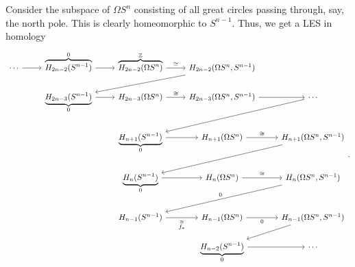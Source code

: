\documentclass[10pt,letterpaper,cm]{nupset}
\theoremstyle{definition}
\theoremstyle{theorem}
\theoremstyle{remark}
\newcommand{\Z}{\mathbb Z}
\newcommand{\1}{\mathbb{1}}
\newcommand{\0}{\vec 0}
\begin{document}
Consider the subspace of $\Omega{S^n}$ consisting of all great circles passing through, say, the north pole. This is clearly homeomorphic to $S^{n-1}$. Thus, we get a LES in homology
\[
\begin{tikzcd}
\cdots \arrow[r] & \overbrace{H_{2n-2}(S^{n-1})}^{0} \arrow[r]  & \overbrace{H_{2n-2}(\Omega{S^n})}^{\Z} \arrow[r, "\cong"] & {H_{2n-2}(\Omega{S^n}, S^{n-1})} \arrow[lld] &                                                 \\
                 & \underbrace{H_{2n-3}(S^{n-1})}_{0} \arrow[r] & H_{2n-3}(\Omega{S^n}) \arrow[r, "\cong"]                  & {H_{2n-3}(\Omega{S^n}, S^{n-1})} \arrow[r]   & \cdots \arrow[lld]                              \\
                 &                                              & \underbrace{H_{n+1}(S^{n-1})}_{0} \arrow[r]               & H_{n+1}(\Omega{S^n}) \arrow[r, "\cong"]      & {H_{n+1}(\Omega{S^n}, S^{n-1})} \arrow[lld]     \\
                 &                                              & \underbrace{H_{n}(S^{n-1})}_{0} \arrow[r]                 & H_{n}(\Omega{S^n}) \arrow[r, "\cong"]        & {H_{n}(\Omega{S^n}, S^{n-1})} \arrow[lld, "0"'] \\
                 &                                              & H_{n-1}(S^{n-1}) \arrow[r, "\overset{\cong}{f_{\ast}}"']  & H_{n-1}(\Omega{S^n}) \arrow[r, "0"']         & {H_{n-1}(\Omega{S^n}, S^{n-1})} \arrow[ld]      \\
                 &                                              &                                                           & \underbrace{H_{n-2}(S^{n-1})}_{0} \arrow[r]  & \cdots                                         
\end{tikzcd}.
\]
\end{document}
